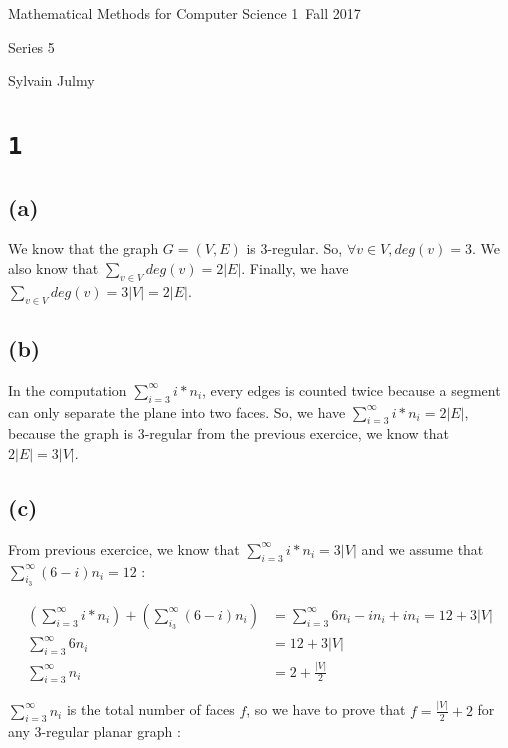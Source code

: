 \documentclass[a4paper,11pt]{report}
\author{Sylvain Julmy}
\date{\today}
\begin{document}
\begin{center}
  \Large{
    Mathematical Methods for Computer Science 1\
    Fall 2017
  }
  \noindent\makebox[\linewidth]{\rule{\linewidth}{0.4pt}}

  Series 5
  \vspace*{1.4cm}

  Sylvain Julmy
  
  \noindent\makebox[\linewidth]{\rule{\linewidth}{0.4pt}}
\end{center}

\section*{\texttt{1}}

\subsection*{(a)}
We know that the graph $G=(V,E)$ is $3$-regular. So, $\forall v \in V, deg(v) =
3$. We also know that $\sum_{v \in V} deg(v) = 2|E|$. Finally, we have $\sum_{v
  \in V} deg(v) = 3 |V| = 2|E|$.

\subsection*{(b)}

In the computation $\sum_{i=3}^\infty i * n_i$, every edges is counted twice because a
segment can only separate the plane into two faces. So, we have
$\sum_{i=3}^\infty i * n_i = 2 |E|$, because the graph is $3$-regular from the
previous exercice, we know that $2|E| = 3|V|$.

\subsection*{(c)}

From previous exercice, we know that $\sum_{i=3}^\infty i * n_i = 3|V|$ and we
assume that $\sum_{i_3}^\infty (6-i)n_i = 12$ :

\begin{align*}
  (\sum_{i=3}^\infty i * n_i) + (\sum_{i_3}^\infty (6-i)n_i) &= \sum_{i=3}^\infty 6n_i - in_i + in_i = 12 + 3|V| \\
 \sum_{i=3}^\infty 6n_i &= 12 + 3 |V| \\
 \sum_{i=3}^\infty n_i &= 2 + \frac{|V|}{2}
\end{align*}

$\sum_{i=3}^\infty n_i$ is the total number of faces $f$, so we have to prove
that $f = \frac{|V|}{2} + 2$ for any $3$-regular planar graph :
\end{document}
